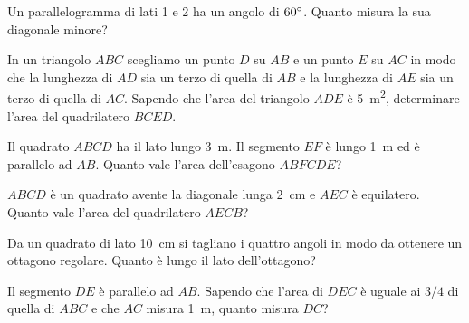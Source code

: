 \begin{multicols}{2}
\begin{esercizio}
\label{ese:7.101}
Un parallelogramma di lati 1 e 2 ha un angolo di $60{}^{\circ}$. Quanto misura la sua diagonale minore?   
\end{esercizio}

\begin{esercizio}
\label{ese:7.102}
In un triangolo $ABC$ scegliamo un punto $D$ su $AB$ e un punto $E$ su $AC$ in modo che la lunghezza di $AD$ sia un terzo di quella di $AB$ e la lunghezza di $AE$ sia un terzo di quella di $AC$. Sapendo che l'area del triangolo $ADE$ è 5~m\textsuperscript{2}, determinare l'area del quadrilatero $BCED$.
\end{esercizio}

\begin{esercizio}
\label{ese:7.103}
Il quadrato $ABCD$ ha il lato lungo 3~m. Il segmento $EF$ è lungo 1~m ed è parallelo ad $AB$. Quanto vale l'area dell'esagono $ABFCDE$?
\end{esercizio}

	\centering

\begin{esercizio}
\label{ese:7.104}
$ABCD$ è un quadrato avente la diagonale lunga 2~cm e $AEC$ è equilatero. Quanto vale l'area del quadrilatero $AECB$?
\end{esercizio}

	\centering

\begin{esercizio}
\label{ese:7.105}
Da un quadrato di lato 10~cm si tagliano i quattro angoli in modo da ottenere un ottagono regolare. Quanto è lungo il lato dell'ottagono?
\end{esercizio}

	\centering

\begin{esercizio}
\label{ese:7.106}
Il segmento $DE$ è parallelo ad $AB$. Sapendo che l'area di $DEC$ è uguale ai $3/4$ di quella di $ABC$ e che $AC$ misura 1~m, quanto misura $DC$?
\end{esercizio}


\end{multicols}
